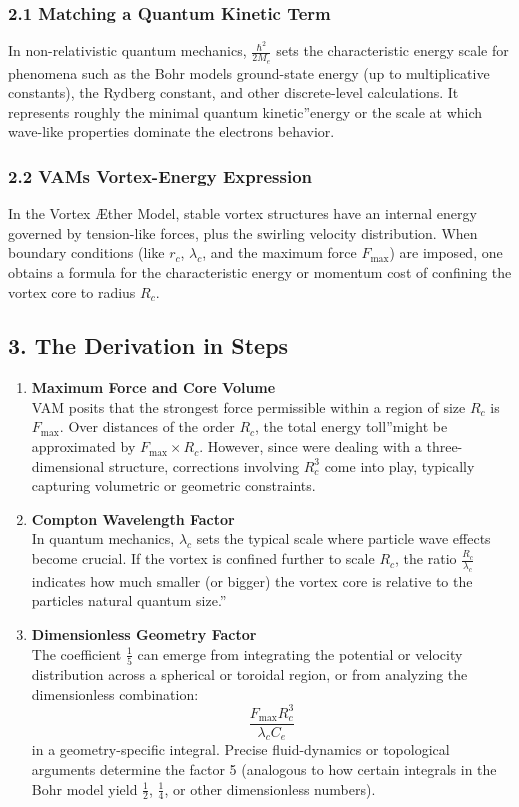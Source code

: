 \subsubsection*{2.1 Matching a Quantum Kinetic Term}
In non-relativistic quantum mechanics, \(\frac{\hbar^2}{2M_e}\) sets the characteristic energy scale for phenomena such as the Bohr model\rqs s ground-state energy (up to multiplicative constants), the Rydberg constant, and other discrete-level calculations. It represents roughly the minimal \grqq quantum kinetic\textquotedblright energy or the scale at which wave-like properties dominate the electron\rqs s behavior.

\subsubsection*{2.2 VAM\rqs s Vortex-Energy Expression}
In the Vortex Æther Model, stable vortex structures have an internal energy governed by tension-like forces, plus the swirling velocity distribution. When boundary conditions (like \(r_c\), \(\lambda_c\), and the maximum force \(F_{\max}\)) are imposed, one obtains a formula for the characteristic energy or momentum cost of confining the vortex core to radius \(R_c\).

\subsection*{3. The Derivation in Steps}

\begin{enumerate}
    \item \textbf{Maximum Force and Core Volume} \\
    VAM posits that the strongest force permissible within a region of size \(R_c\) is \(F_{\max}\). Over distances of the order \(R_c\), the total \grqq energy toll\textquotedblright might be approximated by \(F_{\max} \times R_c\). However, since we\rqs re dealing with a three-dimensional structure, corrections involving \(R_c^3\) come into play, typically capturing volumetric or geometric constraints.
    \item \textbf{Compton Wavelength Factor} \\
    In quantum mechanics, \(\lambda_c\) sets the typical scale where particle wave effects become crucial. If the vortex is confined further to scale \(R_c\), the ratio \(\tfrac{R_c}{\lambda_c}\) indicates how much smaller (or bigger) the vortex core is relative to the particle\rqs s natural quantum \grqq size.\textquotedblright
    \item \textbf{Dimensionless Geometry Factor} \\
    The coefficient \(\frac{1}{5}\) can emerge from integrating the potential or velocity distribution across a spherical or toroidal region, or from analyzing the dimensionless combination:
    \[
        \frac{F_{\max} R_c^3}{\lambda_c C_e}
    \]
    in a geometry-specific integral. Precise fluid-dynamics or topological arguments determine the factor 5 (analogous to how certain integrals in the Bohr model yield \(\tfrac12\), \(\tfrac14\), or other dimensionless numbers).
\end{enumerate}

